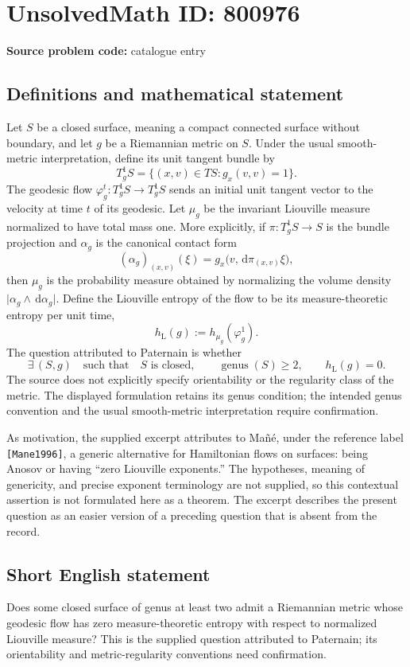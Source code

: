 \documentclass[11pt]{article}
\newcommand{\dd}{\,\mathrm{d}}
\begin{document}
\section*{UnsolvedMath ID: 800976}
\textbf{Source problem code:} catalogue entry
\subsection{Definitions and mathematical statement}
Let \(S\) be a closed surface, meaning a compact connected surface without boundary, and let \(g\) be a Riemannian metric on \(S\). Under the usual smooth-metric interpretation, define its unit tangent bundle by
\[
T^1_gS=\{(x,v)\in TS:g_x(v,v)=1\}.
\]
The geodesic flow \(\varphi_g^t:T^1_gS\to T^1_gS\) sends an initial unit tangent vector to the velocity at time \(t\) of its geodesic. Let \(\mu_g\) be the invariant Liouville measure normalized to have total mass one. More explicitly, if \(\pi:T^1_gS\to S\) is the bundle projection and \(\alpha_g\) is the canonical contact form
\[
(\alpha_g)_{(x,v)}(\xi)=g_x\bigl(v,\dd\pi_{(x,v)}\xi\bigr),
\]
then \(\mu_g\) is the probability measure obtained by normalizing the volume density \(\lvert\alpha_g\wedge\dd\alpha_g\rvert\). Define the Liouville entropy of the flow to be its measure-theoretic entropy per unit time,
\[
h_{\mathrm L}(g):=h_{\mu_g}(\varphi_g^1).
\]
The question attributed to Paternain is whether
\[
\exists\,(S,g)\quad \text{such that}\quad S\text{ is closed},\qquad \operatorname{genus}(S)\ge 2,\qquad h_{\mathrm L}(g)=0.
\]
The source does not explicitly specify orientability or the regularity class of the metric. The displayed formulation retains its genus condition; the intended genus convention and the usual smooth-metric interpretation require confirmation.

As motivation, the supplied excerpt attributes to Ma\~n\'e, under the reference label \texttt{[Mane1996]}, a generic alternative for Hamiltonian flows on surfaces: being Anosov or having ``zero Liouville exponents.'' The hypotheses, meaning of genericity, and precise exponent terminology are not supplied, so this contextual assertion is not formulated here as a theorem. The excerpt describes the present question as an easier version of a preceding question that is absent from the record.
\subsection{Short English statement}
Does some closed surface of genus at least two admit a Riemannian metric whose geodesic flow has zero measure-theoretic entropy with respect to normalized Liouville measure? This is the supplied question attributed to Paternain; its orientability and metric-regularity conventions need confirmation.
\end{document}
